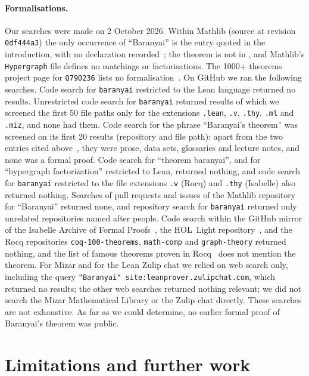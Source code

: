 \documentclass[11pt]{article}
\theoremstyle{definition}
\theoremstyle{remark}
\newcommand{\lean}[1]{\texttt{#1}}
\begin{document}
\paragraph{Formalisations.} Our searches were made on 2 October 2026. Within Mathlib (source at
revision \texttt{0df444a3}) the only occurrence of ``Baranyai'' is the  entry
quoted in the introduction, with no declaration recorded~\cite{Mathlib1000}; the theorem is not in
, and Mathlib's \lean{Hypergraph} file defines no matchings or factorisations.
The 1000+ theorems project page for \texttt{Q790236} lists no formalisation~\cite{Plus1000}. On GitHub
we ran the following searches. Code search for \texttt{baranyai} restricted to the Lean language
returned no results. Unrestricted code search for \texttt{baranyai} returned results of which we
screened the first 50 file paths only for the extensions \texttt{.lean}, \texttt{.v}, \texttt{.thy},
\texttt{.ml} and \texttt{.miz}, and none had them. Code search for the phrase ``Baranyai's
theorem'' was screened on its first 20 results (repository and file path): apart from the two entries cited above~\cite{Mathlib1000,
Plus1000}, they were prose, data sets, glossaries and lecture notes, and none was a formal proof.
Code search for ``theorem baranyai'', and for ``hypergraph factorization'' restricted to Lean,
returned nothing, and code search for \texttt{baranyai}
restricted to the file extensions \texttt{.v} (Rocq) and \texttt{.thy} (Isabelle) also returned
nothing. Searches of pull requests and issues of the Mathlib repository for ``Baranyai'' returned
none, and repository search for \texttt{baranyai} returned only unrelated repositories named after
people. Code search within the GitHub mirror of
the Isabelle Archive of Formal Proofs~\cite{AFP}, the HOL~Light repository~\cite{HOLLight}, and the
Rocq repositories \texttt{coq-100-theorems}, \texttt{math-comp} and \texttt{graph-theory} returned
nothing, and the list of famous theorems proven in Rocq~\cite{Rocq100} does not mention the theorem.
For Mizar and for the Lean Zulip chat we relied on web search only, including the query
\texttt{"Baranyai" site:leanprover.zulipchat.com}, which returned no results; the other web
searches returned nothing relevant; we did not search the Mizar Mathematical Library
or the Zulip chat directly. These searches are not exhaustive. As far as we could determine, no
earlier formal proof of Baranyai's theorem was public.

\section{Limitations and further work}\label{sec:limits}
\end{document}
